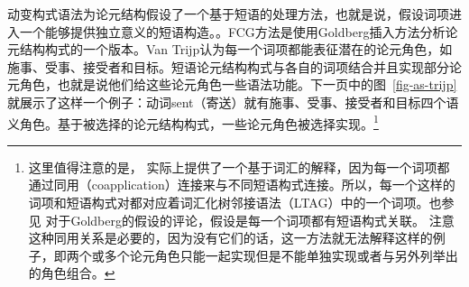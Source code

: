 动变构式语法为论元结构假设了一个基于短语的处理方法，也就是说，假设词项进入一个能够提供独立意义的短语构造。\citep{vanTrijp2011a}。FCG方法是使用Goldberg插入方法分析论元结构构式的一个版本\citep{Goldberg95a}。Van Trijp认为每一个词项都能表征潜在的论元角色，如施事、受事、接受者和目标。短语论元结构构式与各自的词项结合并且实现部分论元角色，也就是说他们给这些论元角色一些语法功能。下一页中的图~\vref{fig-as-trijp}就展示了这样一个例子：动词sent（寄送）就有施事、受事、接受者和目标四个语义角色。基于被选择的论元结构构式，一些论元角色被选择实现。\footnote{%
这里值得注意的是， \citet[]{vanTrijp2011a}实际上提供了一个基于词汇的解释，因为每一个词项都通过同用（coapplication）连接来与不同短语构式连接。所以，每一个这样的词项和短语构式对都对应着词汇化树邻接语法（LTAG）中的一个词项。也参见 对于Goldberg的假设的评论，假设是每一个词项都有短语构式关联。
注意这种同用关系是必要的，因为没有它们的话，这一方法就无法解释这样的例子，即两个或多个论元角色只能一起实现但是不能单独实现或者与另外列举出的角色组合。
}

